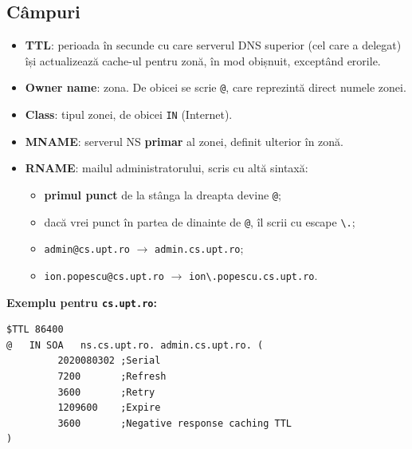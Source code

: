 \documentclass[11pt,a4paper]{article}
\newcommand{\cod}[1]{\texttt{#1}}
\begin{document}
\subsection*{Câmpuri}
\begin{itemize}
  \item \textbf{TTL}: perioada în secunde cu care serverul DNS superior (cel care a delegat) își actualizează cache-ul pentru zonă, în mod obișnuit, exceptând erorile.
  \item \textbf{Owner name}: zona. De obicei se scrie \cod{@}, care reprezintă direct numele zonei.
  \item \textbf{Class}: tipul zonei, de obicei \cod{IN} (Internet).
  \item \textbf{MNAME}: serverul NS \textbf{primar} al zonei, definit ulterior în zonă.
  \item \textbf{RNAME}: mailul administratorului, scris cu altă sintaxă:
  \begin{itemize}
    \item \textbf{primul punct} de la stânga la dreapta devine \cod{@};
    \item dacă vrei punct în partea de dinainte de \cod{@}, îl scrii cu escape \cod{\textbackslash.};
    \item \cod{admin@cs.upt.ro} $\rightarrow$ \cod{admin.cs.upt.ro};
    \item \cod{ion.popescu@cs.upt.ro} $\rightarrow$ \cod{ion\textbackslash.popescu.cs.upt.ro}.
  \end{itemize}
\end{itemize}

\textbf{Exemplu pentru \cod{cs.upt.ro}:}
\begin{lstlisting}
$TTL 86400
@   IN SOA   ns.cs.upt.ro. admin.cs.upt.ro. (
         2020080302 ;Serial
         7200       ;Refresh
         3600       ;Retry
         1209600    ;Expire
         3600       ;Negative response caching TTL
)
\end{lstlisting}
\end{document}
